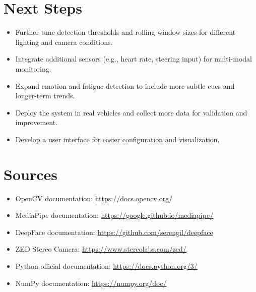 \documentclass[12pt]{article}
\begin{document}
\section{Next Steps}
\begin{itemize}
    \item Further tune detection thresholds and rolling window sizes for different lighting and camera conditions.
    \item Integrate additional sensors (e.g., heart rate, steering input) for multi-modal monitoring.
    \item Expand emotion and fatigue detection to include more subtle cues and longer-term trends.
    \item Deploy the system in real vehicles and collect more data for validation and improvement.
    \item Develop a user interface for easier configuration and visualization.
\end{itemize}

\section{Sources}
\begin{itemize}
    \item OpenCV documentation: \url{https://docs.opencv.org/}
    \item MediaPipe documentation: \url{https://google.github.io/mediapipe/}
    \item DeepFace documentation: \url{https://github.com/serengil/deepface}
    \item ZED Stereo Camera: \url{https://www.stereolabs.com/zed/}
    \item Python official documentation: \url{https://docs.python.org/3/}
    \item NumPy documentation: \url{https://numpy.org/doc/}
\end{itemize}
\end{document}
